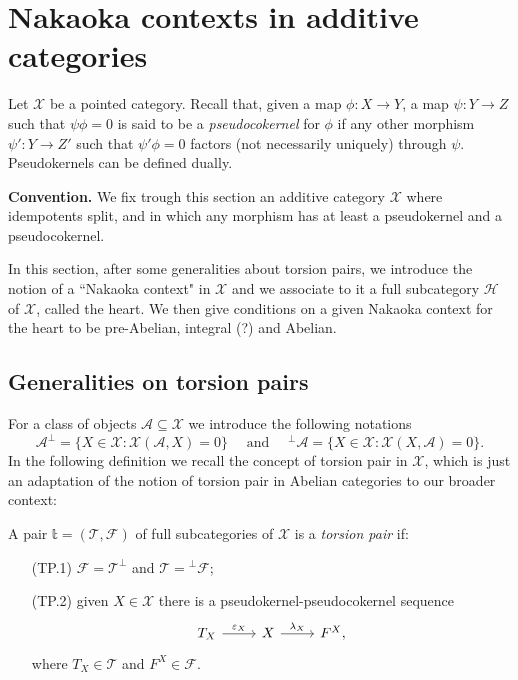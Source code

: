 \clearpage

\section{Nakaoka contexts in additive categories}

Let $\mathcal{X}$ be a pointed category. Recall that, given a map $\phi\colon X\to Y$, a map $\psi\colon Y\to Z$ such that $\psi\phi=0$ is said to be a {\em pseudocokernel} for $\phi$ if any other morphism $\psi'\colon Y\to Z'$ such that $\psi'\phi=0$ factors (not necessarily uniquely) through $\psi$. Pseudokernels can be defined dually.

\medskip\noindent
{\bf Convention.} We fix  trough this section an additive category $\mathcal{X}$ where  idempotents split, and in which any morphism has at least a pseudokernel and a pseudocokernel.

\medskip
In this section, after some generalities about torsion pairs, we introduce the notion of a ``Nakaoka context" in $\mathcal X$ and we associate to it a full subcategory $\mathcal H$ of $\mathcal X$, called the heart. We then give conditions on a given Nakaoka context for the heart to be pre-Abelian, integral (?) and Abelian. 

\subsection{Generalities on torsion pairs}

For a class of objects $\mathcal A\subseteq \mathcal X$ we introduce the following notations
\[
\mathcal A^\perp = \{X\in\mathcal{X}:\mathcal{X}(\mathcal A,X)=0\}\quad \text{ and }\quad {^\perp\mathcal A} = \{X\in\mathcal{X}:\mathcal{X}(X,\mathcal A)=0\}.
\]
In the following definition we recall the concept of torsion pair in $\mathcal X$, which is just an adaptation of the notion of torsion pair in Abelian categories to our broader context:

\begin{definition}
A pair $\mathbb{t}=(\mathcal{T},\mathcal{F})$ of full subcategories of $\mathcal{X}$ is  a {\em torsion pair} if:
\begin{enumerate}
\item[\rm (TP.1)] $\mathcal{F}=\mathcal{T}^\perp$ and $\mathcal{T}={^\perp\mathcal{F}}$;
\item[\rm (TP.2)] given $X\in\mathcal{X}$ there is a pseudokernel-pseudocokernel sequence
\begin{equation*}
\begin{tikzcd}
T_X\arrow{r}{\varepsilon_X}& X\arrow{r}{\lambda_X}&F^X,
\end{tikzcd}
\end{equation*}
where $T_X\in\mathcal{T}$ and $F^X\in\mathcal{F}$.
\end{enumerate}
\end{definition}

